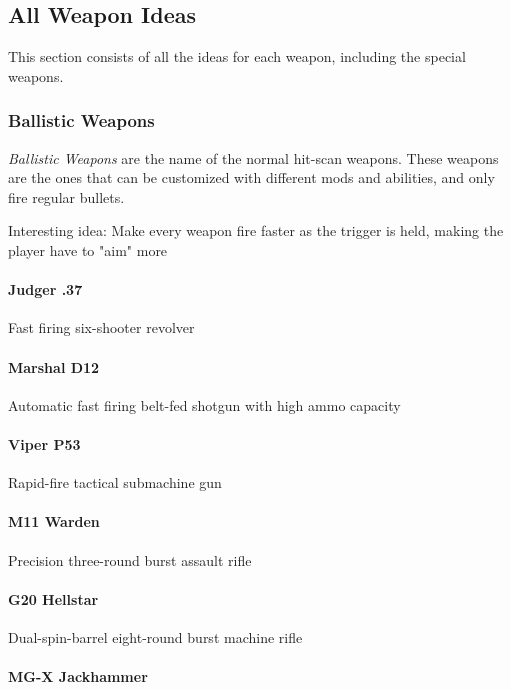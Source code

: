 \documentclass[../Main.tex]{subfiles}
\begin{document}
\subsection{All Weapon Ideas}

This section consists of all the ideas for each weapon, including the special weapons.

\subsubsection{Ballistic Weapons}

\emph{Ballistic Weapons} are the name of the normal hit-scan weapons. These weapons are the ones that can be customized with different mods and abilities, and only fire regular bullets.

Interesting idea: Make every weapon fire faster as the trigger is held, making the player have to "aim" more 

\paragraph{Judger .37}

Fast firing six-shooter revolver

\paragraph{Marshal D12}

Automatic fast firing belt-fed shotgun with high ammo capacity

\paragraph{Viper P53}

Rapid-fire tactical submachine gun

\paragraph{M11 Warden}

Precision three-round burst assault rifle

\paragraph{G20 Hellstar}

Dual-spin-barrel eight-round burst machine rifle

\paragraph{MG-X Jackhammer}
\end{document}

